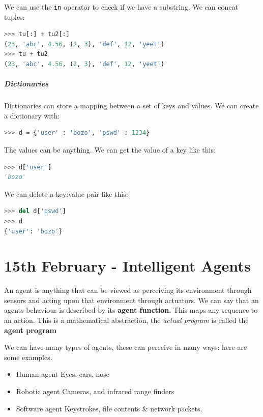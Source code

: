 \documentclass{article}
\begin{document}
We can use the \texttt{in} operator to check if we have a substring. We can
concat tuples:
\begin{lstlisting}[inputencoding=utf8/latin1,basicstyle=\ttfamily,
language=python, keywordstyle=\color{blue}\bfseries, rulecolor=\color{black}]
>>> tu[:] + tu2[:]
(23, 'abc', 4.56, (2, 3), 'def', 12, 'yeet')
>>> tu + tu2
(23, 'abc', 4.56, (2, 3), 'def', 12, 'yeet')
\end{lstlisting}

\subparagraph{Dictionaries}
Dictionaries can store a mapping between a set of keys and values. We can
create a dictionary with:
\begin{lstlisting}[inputencoding=utf8/latin1,basicstyle=\ttfamily,
language=python, keywordstyle=\color{blue}\bfseries, rulecolor=\color{black}]
>>> d = {'user' : 'bozo', 'pswd' : 1234}
\end{lstlisting}
The values can be anything. We can get the value of a key like this:
\begin{lstlisting}[inputencoding=utf8/latin1,basicstyle=\ttfamily,
language=python, keywordstyle=\color{blue}\bfseries, rulecolor=\color{black}]
>>> d['user']
'bozo'
\end{lstlisting}
We can delete a key:value pair like this:
\begin{lstlisting}[inputencoding=utf8/latin1,basicstyle=\ttfamily,
language=python, keywordstyle=\color{blue}\bfseries, rulecolor=\color{black}]
>>> del d['pswd']
>>> d
{'user': 'bozo'}
\end{lstlisting}

\section{15th February - Intelligent Agents}
An agent is anything that can be viewed as perceiving its environment through
sensors and acting upon that environment through actuators. We can say that
an agents behaviour is described by its \textbf{agent function}. This maps any sequence
to an action. This is a mathematical abstraction, the \textit{actual program} is
called the \textbf{agent program}

We can have many types of agents, these can perceive in many ways: here are some
examples.
\begin{itemize}
  \item Human agent
    \subitem Eyes, ears, nose
  \item Robotic agent
    \subitem Cameras, and infrared range finders
  \item Software agent
    \subitem Keystrokes, file contents \& network packets.
\end{itemize}
\end{document}
